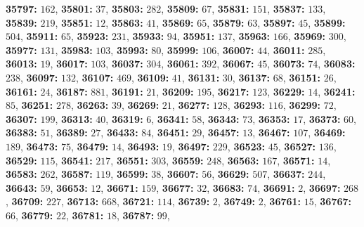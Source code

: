 \textsf{\bfseries 35797:} $162$, \textsf{\bfseries 35801:} $37$, \textsf{\bfseries 35803:} $282$, \textsf{\bfseries 35809:} $67$, \textsf{\bfseries 35831:} $151$, \textsf{\bfseries 35837:} $133$, \textsf{\bfseries 35839:} $219$, \textsf{\bfseries 35851:} $12$, \textsf{\bfseries 35863:} $41$, \textsf{\bfseries 35869:} $65$, \textsf{\bfseries 35879:} $63$, \textsf{\bfseries 35897:} $45$, \textsf{\bfseries 35899:} $504$, \textsf{\bfseries 35911:} $65$, \textsf{\bfseries 35923:} $231$, \textsf{\bfseries 35933:} $94$, \textsf{\bfseries 35951:} $137$, \textsf{\bfseries 35963:} $166$, \textsf{\bfseries 35969:} $300$, \textsf{\bfseries 35977:} $131$, \textsf{\bfseries 35983:} $103$, \textsf{\bfseries 35993:} $80$, \textsf{\bfseries 35999:} $106$, \textsf{\bfseries 36007:} $44$, \textsf{\bfseries 36011:} $285$, \textsf{\bfseries 36013:} $19$, \textsf{\bfseries 36017:} $103$, \textsf{\bfseries 36037:} $304$, \textsf{\bfseries 36061:} $392$, \textsf{\bfseries 36067:} $45$, \textsf{\bfseries 36073:} $74$, \textsf{\bfseries 36083:} $238$, \textsf{\bfseries 36097:} $132$, \textsf{\bfseries 36107:} $469$, \textsf{\bfseries 36109:} $41$, \textsf{\bfseries 36131:} $30$, \textsf{\bfseries 36137:} $68$, \textsf{\bfseries 36151:} $26$, \textsf{\bfseries 36161:} $24$, \textsf{\bfseries 36187:} $881$, \textsf{\bfseries 36191:} $21$, \textsf{\bfseries 36209:} $195$, \textsf{\bfseries 36217:} $123$, \textsf{\bfseries 36229:} $14$, \textsf{\bfseries 36241:} $85$, \textsf{\bfseries 36251:} $278$, \textsf{\bfseries 36263:} $39$, \textsf{\bfseries 36269:} $21$, \textsf{\bfseries 36277:} $128$, \textsf{\bfseries 36293:} $116$, \textsf{\bfseries 36299:} $72$, \textsf{\bfseries 36307:} $199$, \textsf{\bfseries 36313:} $40$, \textsf{\bfseries 36319:} $6$, \textsf{\bfseries 36341:} $58$, \textsf{\bfseries 36343:} $73$, \textsf{\bfseries 36353:} $17$, \textsf{\bfseries 36373:} $60$, \textsf{\bfseries 36383:} $51$, \textsf{\bfseries 36389:} $27$, \textsf{\bfseries 36433:} $84$, \textsf{\bfseries 36451:} $29$, \textsf{\bfseries 36457:} $13$, \textsf{\bfseries 36467:} $107$, \textsf{\bfseries 36469:} $189$, \textsf{\bfseries 36473:} $75$, \textsf{\bfseries 36479:} $14$, \textsf{\bfseries 36493:} $19$, \textsf{\bfseries 36497:} $229$, \textsf{\bfseries 36523:} $45$, \textsf{\bfseries 36527:} $136$, \textsf{\bfseries 36529:} $115$, \textsf{\bfseries 36541:} $217$, \textsf{\bfseries 36551:} $303$, \textsf{\bfseries 36559:} $248$, \textsf{\bfseries 36563:} $167$, \textsf{\bfseries 36571:} $14$, \textsf{\bfseries 36583:} $262$, \textsf{\bfseries 36587:} $119$, \textsf{\bfseries 36599:} $38$, \textsf{\bfseries 36607:} $56$, \textsf{\bfseries 36629:} $507$, \textsf{\bfseries 36637:} $244$, \textsf{\bfseries 36643:} $59$, \textsf{\bfseries 36653:} $12$, \textsf{\bfseries 36671:} $159$, \textsf{\bfseries 36677:} $32$, \textsf{\bfseries 36683:} $74$, \textsf{\bfseries 36691:} $2$, \textsf{\bfseries 36697:} $268$, \textsf{\bfseries 36709:} $227$, \textsf{\bfseries 36713:} $668$, \textsf{\bfseries 36721:} $114$, \textsf{\bfseries 36739:} $2$, \textsf{\bfseries 36749:} $2$, \textsf{\bfseries 36761:} $15$, \textsf{\bfseries 36767:} $66$, \textsf{\bfseries 36779:} $22$, \textsf{\bfseries 36781:} $18$, \textsf{\bfseries 36787:} $99$, 
